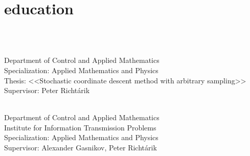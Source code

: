 \documentclass[]{deedy-resume-openfont}
\begin{document}
\begin{minipage}[t]{0.66\textwidth} 

\section{education}
\\
\begin{tightemize}
	\item
{}\\
Department of Control and Applied Mathematics\\
Specialization: Applied Mathematics and Physics\\
Thesis: <<Stochastic coordinate descent method with arbitrary sampling>>\\
\normalsize Supervisor: Peter Richt{\'a}rik\\
\vspace{0.1em}
\item
{}\\
Department of Control and Applied Mathematics\\
Institute for Information Transmission Problems\\
Specialization: Applied Mathematics and Physics\\
\normalsize Supervisor: Alexander Gasnikov, Peter Richt{\'a}rik \\
\end{tightemize}
\vspace{0.1em}

\end{minipage}
\end{document}
